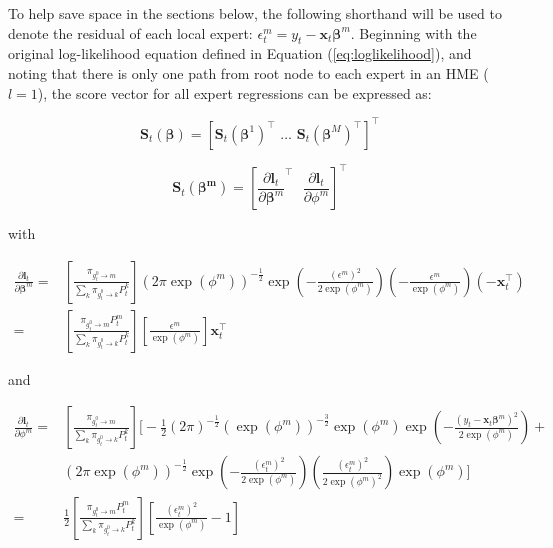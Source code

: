 \documentclass[12pt]{article}
\newcommand{\gateprod}[2]{\pi_{#1 \longrightarrow #2}}
\theoremstyle{definition}
\begin{document}
To help save space in the sections below, the following shorthand will be used to denote the residual of each local expert: $\epsilon^{m}_{t} = y_{t} - \boldsymbol{x}_{t} \boldsymbol{\beta}^{m}$. Beginning with the original log-likelihood equation defined in Equation (\ref{eq:loglikelihood}), and noting that there is only one path from root node to each expert in an HME ($l = 1$), the score vector for all expert regressions can be expressed as:

\begin{equation}
  \boldsymbol{S}_{t}(\boldsymbol{\beta}) = [ \boldsymbol{S}_{t}(\boldsymbol{\beta}^{1})^{\top} \,\, \ldots \,\, \boldsymbol{S}_{t}(\boldsymbol{\beta}^{M})^{\top} ]^{\top}
\end{equation}

\begin{equation} \label{eq:expertScore}
  \boldsymbol{S}_{t}(\boldsymbol{\beta^{m}}) = \left[ \frac{\partial \boldsymbol{l}_{t}}{\partial \boldsymbol{\beta}^{m}}^{\top} \,\,\,\, \frac{\partial \boldsymbol{l}_{t}}{\partial \phi^{m}} \right]^{\top}
\end{equation}

with

\begin{align} \label{eq:ExpertScoreBeta}
  \frac{\partial \boldsymbol{l}_{t}}{\partial \boldsymbol{\beta}^{m}} =& \left[ \frac{\gateprod{g^{0}_{t}}{m}}{ \sum_{k} \gateprod{g^{0}_{t}}{k} P^{k}_{t}} \right] \left( 2 \pi \exp ( \phi^{m} ) \right)^{-\frac{1}{2}} \exp{ \left( -\frac{  (\epsilon^{m})^{2}  }{2 \exp (\phi^{m}) } \right) } \left( - \frac{\epsilon^{m}}{\exp(\phi^{m})} \right) (-\boldsymbol{x}_{t}^{\top}) \nonumber \\
   =& \left[ \frac{\gateprod{g^{0}_{t}}{m} P^{m}_{t}}{ \sum_{k} \gateprod{g^{0}_{t}}{k} P^{k}_{t}} \right] \left[ \frac{\epsilon^{m}}{\exp(\phi^{m})} \right] \boldsymbol{x}_{t}^{\top}
\end{align}

and

\begin{align} \label{eq:ExpertScoreVariance}
  \frac{\partial \boldsymbol{l}_{t}}{\partial \phi^{m}} =& \left[ \frac{ \gateprod{g^{0}_{t}}{m} }{ \sum_{k} \gateprod{g^{0}_{t}}{k} P^{k}_{t}} \right] \bigg[ -\frac{1}{2} (2 \pi)^{-\frac{1}{2}} \left( \exp ( \phi^{m} ) \right)^{-\frac{3}{2}} \exp ( \phi^{m} ) \exp{ \left( -\frac{  ( y_{t} - \boldsymbol{x}_{t} \boldsymbol{\beta}^{m} )^{2}  }{2 \exp (\phi^{m}) } \right) }   + \nonumber \\
   & \left( 2 \pi \exp ( \phi^{m} ) \right)^{-\frac{1}{2}} \exp{ \left( -\frac{  (\epsilon^{m}_{t})^{2}  }{2 \exp (\phi^{m}) } \right) } \left( \frac{ ( \epsilon^{m}_{t} )^{2} }{ 2 \exp( \phi^{m} )^{2} } \right) \exp( \phi^{m} ) \bigg] \nonumber \\
   =& \frac{1}{2} \left[ \frac{ \gateprod{g^{0}_{t}}{m} P^{m}_{t} }{ \sum_{k} \gateprod{g^{0}_{t}}{k} P^{k}_{t}} \right] \left[ \frac{ (\epsilon^{m}_{t})^{2} }{ \exp( \phi^{m} )} - 1 \right]
\end{align}
\end{document}
